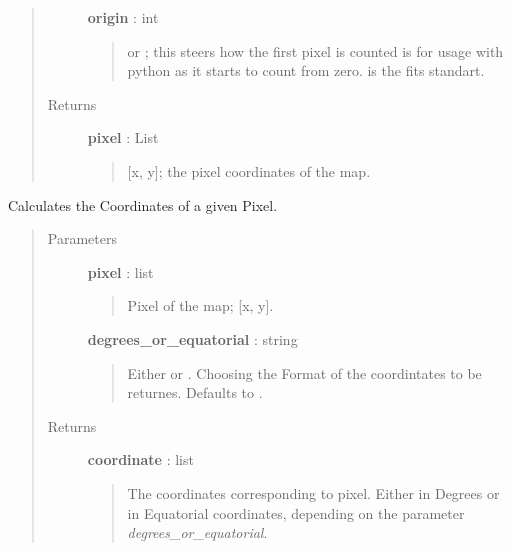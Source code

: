 \documentclass[a4paper,10pt,english]{sphinxmanual}
\begin{document}
\begin{fulllineitems}
\begin{fulllineitems}
\begin{quote}
\begin{description}
\textbf{origin} : int
\begin{quote}

 or ; this steers how the first pixel is counted
 is for usage with python as it starts to count from zero.
 is the fits standart.
\end{quote}

\item[{Returns }] \leavevmode
\textbf{pixel} : List
\begin{quote}

{[}x, y{]}; the pixel coordinates of the map.
\end{quote}

\end{description}\end{quote}

\end{fulllineitems}


\begin{fulllineitems}
\label{maps:astrolyze.maps.fits.FitsMap.pix2sky}
Calculates the Coordinates of a given Pixel.
\begin{quote}\begin{description}
\item[{Parameters }] \leavevmode
\textbf{pixel} : list
\begin{quote}

Pixel of the map; {[}x, y{]}.
\end{quote}

\textbf{degrees\_or\_equatorial} : string
\begin{quote}

Either  or . Choosing the
Format of the coordintates to be returnes.
Defaults to .
\end{quote}

\item[{Returns }] \leavevmode
\textbf{coordinate} : list
\begin{quote}

The coordinates corresponding to pixel. Either in Degrees or in
Equatorial coordinates, depending on the parameter
\emph{degrees\_or\_equatorial}.
\end{quote}

\end{description}\end{quote}


\end{fulllineitems}
\end{fulllineitems}
\end{document}
